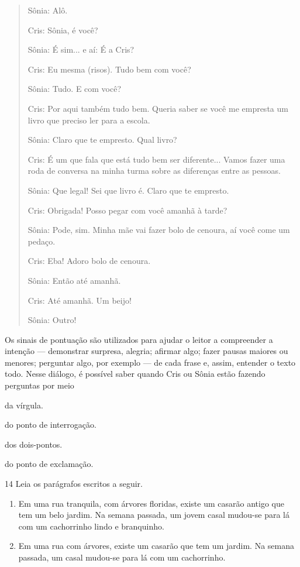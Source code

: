 \begin{quote}
Sônia: Alô.

Cris: Sônia, é você?

Sônia: É sim... e aí: É a Cris?

Cris: Eu mesma (risos). Tudo bem com você?

Sônia: Tudo. E com você?

Cris: Por aqui também tudo bem. Queria saber se você me empresta um
livro que preciso ler para a escola.

Sônia: Claro que te empresto. Qual livro?

Cris: É um que fala que está tudo bem ser diferente... Vamos fazer uma
roda de conversa na minha turma sobre as diferenças entre as pessoas.

Sônia: Que legal! Sei que livro é. Claro que te empresto.

Cris: Obrigada! Posso pegar com você amanhã à tarde?

Sônia: Pode, sim. Minha mãe vai fazer bolo de cenoura, aí você come um
pedaço.

Cris: Eba! Adoro bolo de cenoura.

Sônia: Então até amanhã.

Cris: Até amanhã. Um beijo!

Sônia: Outro!

\end{quote}

Os sinais de pontuação são utilizados para ajudar o leitor a compreender
a intenção --- demonstrar surpresa, alegria; afirmar algo; fazer
pausas maiores ou menores; perguntar algo, por exemplo --- de cada
frase e, assim, entender o texto todo. Nesse diálogo, é possível saber
quando Cris ou Sônia estão fazendo perguntas por meio

\begin{escolha}
\item da vírgula.

\item do ponto de interrogação.

\item dos dois-pontos.

\item do ponto de exclamação.
\end{escolha}


\num{14} Leia os parágrafos escritos a seguir.

\begin{enumerate}
\item Em uma rua tranquila, com árvores floridas, existe um casarão antigo
que tem um belo jardim. Na semana passada, um jovem casal mudou-se para
lá com um cachorrinho lindo e branquinho.

\item Em uma rua com árvores, existe um casarão que tem um jardim. Na
semana passada, um casal mudou-se para lá com um cachorrinho.
\end{enumerate}

